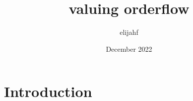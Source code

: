 \documentclass{article}
\title{valuing orderflow}
\author{elijahf }
\date{December 2022}
\begin{document}
\maketitle

\section{Introduction}
\end{document}
